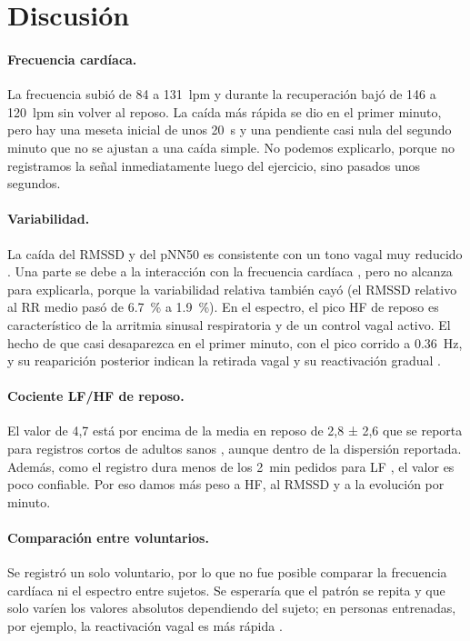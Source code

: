 \section{Discusión}
\label{sec:discusion}

\paragraph{Frecuencia cardíaca.}
La frecuencia subió de 84 a \SI{131}{lpm} y durante la recuperación bajó de 146 a \SI{120}{lpm} sin volver al reposo. La caída más rápida se dio en el primer minuto, pero hay una meseta inicial de unos \SI{20}{\second} y una pendiente casi nula del segundo minuto que no se ajustan a una caída simple. No podemos explicarlo, porque no registramos la señal inmediatamente luego del ejercicio, sino pasados unos segundos.

\paragraph{Variabilidad.}
La caída del RMSSD y del pNN50 es consistente con un tono vagal muy reducido \parencite{shaffer2017}. Una parte se debe a la interacción con la frecuencia cardíaca \parencite{sacha2014}, pero no alcanza para explicarla, porque la variabilidad relativa también cayó (el RMSSD relativo al RR medio pasó de \SI{6.7}{\percent} a \SI{1.9}{\percent}). En el espectro, el pico HF de reposo es característico de la arritmia sinusal respiratoria y de un control vagal activo. El hecho de que casi desaparezca en el primer minuto, con el pico corrido a \SI{0.36}{\hertz}, y su reaparición posterior indican la retirada vagal y su reactivación gradual \parencite{michael2017}.

\paragraph{Cociente LF/HF de reposo.}
El valor de 4,7 está por encima de la media en reposo de 2,8 ± 2,6 que se reporta para registros cortos de adultos sanos \parencite{nunan2010}, aunque dentro de la dispersión reportada. Además, como el registro dura menos de los \SI{2}{\minute} pedidos para LF \parencite{taskforce1996}, el valor es poco confiable. Por eso damos más peso a HF, al RMSSD y a la evolución por minuto.

\paragraph{Comparación entre voluntarios.}
Se registró un solo voluntario, por lo que no fue posible comparar la frecuencia cardíaca ni el espectro entre sujetos. Se esperaría que el patrón se repita y que solo varíen los valores absolutos dependiendo del sujeto; en personas entrenadas, por ejemplo, la reactivación vagal es más rápida \parencite{imai1994}.

